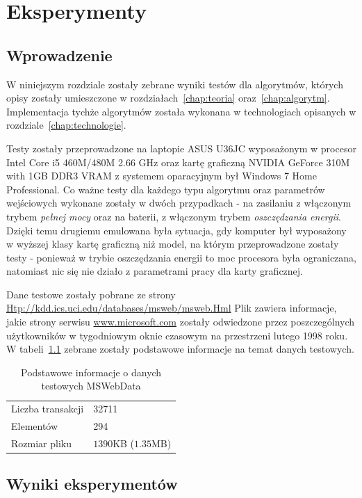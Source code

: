 \chapter{Eksperymenty\label{chap:eksperymenty}}

\section{Wprowadzenie}
W niniejszym rozdziale zostały zebrane wyniki testów dla algorytmów, których opisy zostały umieszczone w rozdziałach~\ref{chap:teoria} oraz~\ref{chap:algorytm}. Implementacja tychże algorytmów została wykonana w technologiach opisanych w rozdziale~\ref{chap:technologie}.

Testy zostały przeprowadzone na laptopie ASUS U36JC wyposażonym w procesor Intel Core i5 460M/480M 2.66 GHz oraz kartę graficzną NVIDIA GeForce 310M with 1GB DDR3 VRAM z systemem oparacyjnym był Windows 7 Home Professional. Co ważne testy dla każdego typu algorytmu oraz parametrów wejściowych wykonane zostały w dwóch przypadkach - na zasilaniu z włączonym trybem \emph{pełnej mocy} oraz na baterii, z włączonym trybem \emph{oszczędzania energii}. Dzięki temu drugiemu emulowana była sytuacja, gdy komputer był wyposażony w wyższej klasy kartę graficzną niż model, na którym przeprowadzone zostały testy - ponieważ w trybie oszczędzania energii to moc procesora była ograniczana, natomiast nic się nie działo z parametrami pracy dla karty graficznej.

Dane testowe zostały pobrane ze strony \url{Htp://kdd.ics.uci.edu/databases/msweb/msweb.Hml} Plik zawiera informacje, jakie strony serwisu \url{www.microsoft.com} zostały odwiedzone przez poszczególnych użytkowników w tygodniowym oknie czasowym na przestrzeni lutego 1998 roku. W tabeli~\ref{msweb:desc} zebrane zostały podstawowe informacje na temat danych testowych.

\begin{table}
	\centering
	\begin{tabular}{l|l}
	Liczba transakcji & 32711 \\
	Elementów & 294 \\ 
	Rozmiar pliku & $1390$KB ($1.35$MB)\\
	\end{tabular}
	\caption{Podstawowe informacje o danych testowych MSWebData\label{msweb:desc}}
\end{table}

\section{Wyniki eksperymentów}
